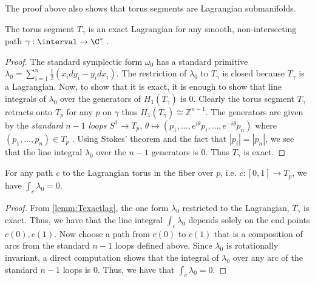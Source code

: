 \begin{remark} \label{rem:torsseglag}
The proof above also shows that torus segments are Lagrangian submanifolds.
\end{remark}


\begin{lemma}\label{lemm:Texactlag}
The torus segment $T_\gamma$ is an exact Lagrangian for any smooth, non-intersecting  path $\gamma : \interval \to \C^*$ .
\end{lemma}

\begin{proof}

The standard symplectic form $\omega_0$ has a standard primitive $\lambda_0 = \sum_{i=1}^{n}\frac{1}{2}(x_idy_i-y_idx_i)$. The restriction of $\lambda_0$ to $T_\gamma$ is closed because $T_\gamma $ is a Lagrangian. Now, to show that it is exact, it is enough to show that  line integrals of $\lambda_0$ over the generators of $H_1(T_\gamma)$ is $0$. Clearly the torus segment $T_\gamma$ retracts onto $T_p$ for any $p$ on $\gamma$ thus $H_1(T_\gamma) \cong \mathbb{Z}^{n-1}$. The generators are given by the \textit{standard }$n-1$ \textit{loops} $S^1 \to T_p$, $\theta \mapsto (p_1,\dots ,e^{i\theta}p_i,\dots,e^{-i\theta}p_n)$ where $(p_1,\dots,p_n) \in T_p$ .  Using Stokes' theorem and the fact that $|p_i| = |p_n|$, we see that the line integral $\lambda_0$ over the $n-1$ generators is $0$. Thus $T_\gamma$ is exact.

\end{proof}

\begin{lemma}\label{rem:texactlag}
For any path $c$ to the Lagrangian torus in the fiber over $p$, i.e. $c:[0,1] \to T_p$, we have $\int_c \lambda_0 = 0$.
\end{lemma}


\begin{proof}
From \ref{lemm:Texactlag}, the one form $\lambda_0$ restricted to the Lagrangian,  $T_\gamma$ is exact. Thus, we have that the line integral $\int_c \lambda_0 $ depends solely on the end points $c(0), c(1)$. Now choose a path from $c(0)$ to $c(1)$ that is a composition of arcs from the standard $n-1$ loops defined above. Since $\lambda_0$ is rotationally invariant, a direct computation shows that the integral of $\lambda_0$ over any arc of the standard $n-1$ loops is 0. Thus, we have that $\int_c \lambda_0 = 0 $.

\end{proof}




